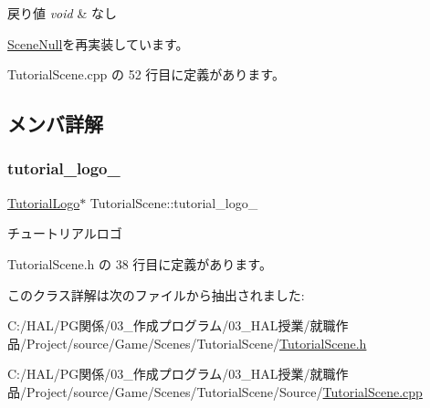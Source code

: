 \begin{DoxyRetVals}{戻り値}
{\em void} & なし \\
\hline
\end{DoxyRetVals}


\mbox{\hyperlink{class_scene_null_abbff54a7323b5ccde4b5094757747738}{Scene\+Null}}を再実装しています。



 Tutorial\+Scene.\+cpp の 52 行目に定義があります。



\subsection{メンバ詳解}
\mbox{\label{class_tutorial_scene_a3c2e0e47c2e6078bb7eff928d72fde2a}} 
\subsubsection{\texorpdfstring{tutorial\+\_\+logo\+\_\+}{tutorial\_logo\_}}
{\footnotesize\ttfamily \mbox{\hyperlink{class_tutorial_logo}{Tutorial\+Logo}}$\ast$ Tutorial\+Scene\+::tutorial\+\_\+logo\+\_\+\hspace{0.3cm}{\ttfamily [private]}}



チュートリアルロゴ 



 Tutorial\+Scene.\+h の 38 行目に定義があります。



このクラス詳解は次のファイルから抽出されました\+:\begin{DoxyCompactItemize}
\item 
C\+:/\+H\+A\+L/\+P\+G関係/03\+\_\+作成プログラム/03\+\_\+\+H\+A\+L授業/就職作品/\+Project/source/\+Game/\+Scenes/\+Tutorial\+Scene/\mbox{\hyperlink{_tutorial_scene_8h}{Tutorial\+Scene.\+h}}\item 
C\+:/\+H\+A\+L/\+P\+G関係/03\+\_\+作成プログラム/03\+\_\+\+H\+A\+L授業/就職作品/\+Project/source/\+Game/\+Scenes/\+Tutorial\+Scene/\+Source/\mbox{\hyperlink{_tutorial_scene_8cpp}{Tutorial\+Scene.\+cpp}}\end{DoxyCompactItemize}
